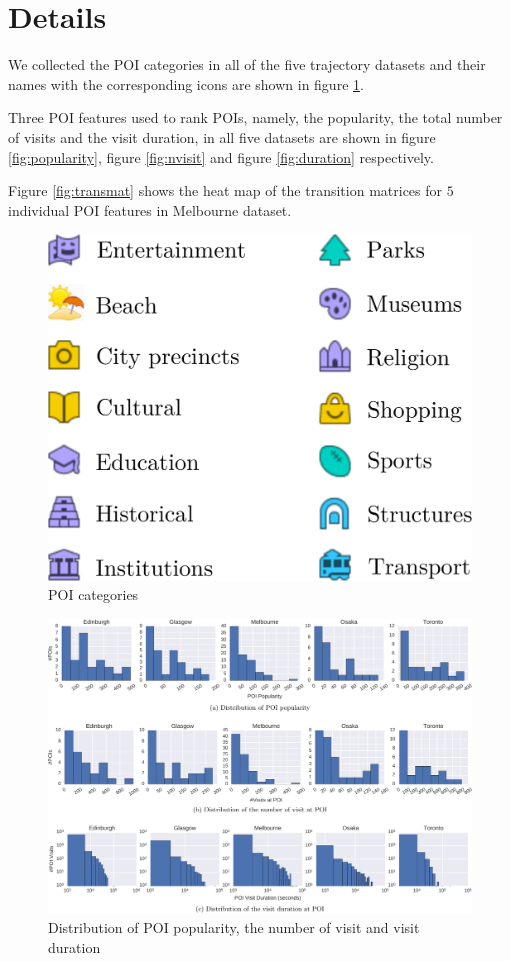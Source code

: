 \appendix
\section{Details}
We collected the POI categories in all of the five trajectory datasets
and their names with the corresponding icons are shown in figure \ref{fig:poicats}.

Three POI features used to rank POIs, namely, the popularity, 
the total number of visits and the visit duration, in all five datasets are shown in 
figure \ref{fig:popularity}, figure \ref{fig:nvisit} and figure \ref{fig:duration} respectively.

Figure \ref{fig:transmat} shows the heat map of the transition matrices for $5$ individual POI features
in Melbourne dataset.


\begin{figure}
\centering
\includegraphics[scale=.32]{fig/poi_cats.pdf}
\caption{POI categories}
\label{fig:poicats}
\end{figure}

\begin{figure}
\includegraphics[width=\textwidth]{fig/feature_distro.pdf}
\caption{Distribution of POI popularity, the number of visit and visit duration}
\label{fig:distro}
\end{figure}


